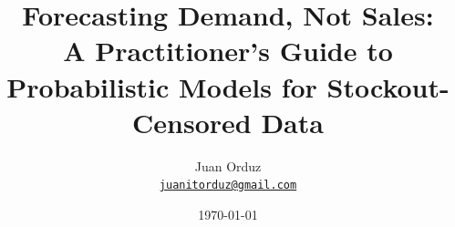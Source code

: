 \documentclass[11pt]{article}
\title{Forecasting Demand, Not Sales:\\ A Practitioner's Guide to Probabilistic Models for Stockout-Censored Data}
\author{Juan Orduz\\ \href{mailto:juanitorduz@gmail.com}{\texttt{juanitorduz@gmail.com}}}
\date{\today}
\begin{document}
\maketitle

\begin{abstract}

\end{abstract}












\end{document}
